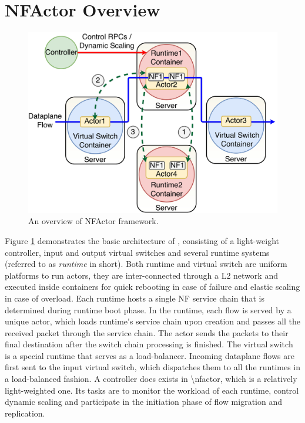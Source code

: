 \section {NFActor Overview}

\begin{figure}[!t]
  \centering
  \includegraphics[width=\columnwidth]{figure/final-final-nfactor-cluster.pdf}
  \caption{An overview of NFActor framework.}
  \label{fig:runtime}
\end{figure}

Figure \ref{fig:runtime} demonstrates the basic architecture of \nfactor, consisting of a light-weight controller, input and output virtual switches and several runtime systems (referred to as \textit{runtime} in short). \ac{Both runtime and virtual switch are uniform platforms to run actors, they are inter-connected through a L2 network and executed inside containers for quick rebooting in case of failure and elastic scaling in case of overload. Each runtime hosts a single NF service chain that is determined during runtime boot phase. In the runtime, each flow is served by a unique actor, which loads runtime's service chain upon creation and passes all the received packet through the service chain. The actor sends the packets to their final destination after the switch chain processing is finished. The virtual switch is a special runtime that serves as a load-balancer.  Incoming dataplane flows are first sent to the input virtual switch, which dispatches them to all the runtimes in a load-balanced fashion. A controller does exists in \nfactor, which is a relatively light-weighted one. Its tasks are to monitor the workload of each runtime, control dynamic scaling and participate in the initiation phase of flow migration and replication.}

